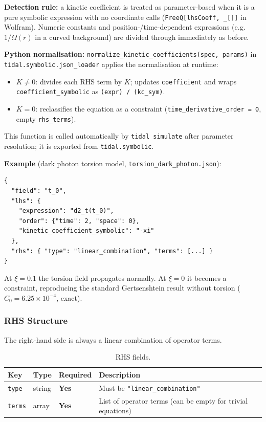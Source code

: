 \textbf{Detection rule:} a kinetic coefficient is treated as parameter-based when
it is a pure symbolic expression with no coordinate calls
(\texttt{FreeQ[lhsCoeff, \_[]]} in Wolfram).  Numeric constants and
position-/time-dependent expressions (e.g.\ $1/\Omega(r)$ in a curved background)
are divided through immediately as before.

\textbf{Python normalisation:}
\texttt{normalize\_kinetic\_coefficients(spec, params)} in
\texttt{tidal.symbolic.json\_loader} applies the normalisation at runtime:
\begin{itemize}
  \item $K \neq 0$: divides each RHS term by $K$; updates \texttt{coefficient} and
    wraps \texttt{coefficient\_symbolic} as \texttt{(expr) / (kc\_sym)}.
  \item $K = 0$: reclassifies the equation as a constraint
    (\texttt{time\_derivative\_order = 0}, empty \texttt{rhs\_terms}).
\end{itemize}
This function is called automatically by \texttt{tidal simulate} after
parameter resolution; it is exported from
\texttt{tidal.symbolic}.

\textbf{Example} (dark photon torsion model, \texttt{torsion\_dark\_photon.json}):

\begin{lstlisting}[style=json]
{
  "field": "t_0",
  "lhs": {
    "expression": "d2_t(t_0)",
    "order": {"time": 2, "space": 0},
    "kinetic_coefficient_symbolic": "-xi"
  },
  "rhs": { "type": "linear_combination", "terms": [...] }
}
\end{lstlisting}

At $\xi = 0.1$ the torsion field propagates normally.
At $\xi = 0$ it becomes a constraint, reproducing the standard
Gertsenshtein result without torsion ($C_0 = 6.25 \times 10^{-4}$, exact).

\subsubsection{RHS Structure}
\label{sec:json-rhs}

The right-hand side is always a linear combination of operator terms.

\begin{table}[htbp]
\centering
\caption{RHS fields.}
\label{tab:json-rhs}
\begin{tabular}{@{}llll@{}}
\toprule
Key & Type & Required & Description \\
\midrule
\texttt{type}  & string & \textbf{Yes} & Must be \texttt{"linear\_combination"} \\
\texttt{terms} & array  & \textbf{Yes} & List of operator terms (can be empty for trivial equations) \\
\bottomrule
\end{tabular}
\end{table}


